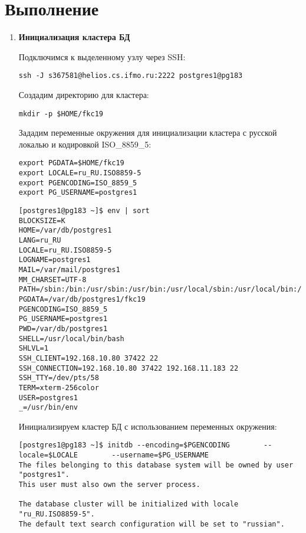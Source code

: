 \section{Выполнение}

\begin{enumerate}
\item \textbf{Инициализация кластера БД}

Подключимся к выделенному узлу через SSH:

\begin{verbatim}
ssh -J s367581@helios.cs.ifmo.ru:2222 postgres1@pg183
\end{verbatim}

Создадим директорию для кластера:

\begin{verbatim}
mkdir -p $HOME/fkc19
\end{verbatim}

Зададим переменные окружения для инициализации кластера с русской локалью и кодировкой ISO\_8859\_5:

\begin{verbatim}
export PGDATA=$HOME/fkc19
export LOCALE=ru_RU.ISO8859-5
export PGENCODING=ISO_8859_5
export PG_USERNAME=postgres1
\end{verbatim}

\begin{verbatim}
[postgres1@pg183 ~]$ env | sort
BLOCKSIZE=K
HOME=/var/db/postgres1
LANG=ru_RU
LOCALE=ru_RU.ISO8859-5
LOGNAME=postgres1
MAIL=/var/mail/postgres1
MM_CHARSET=UTF-8
PATH=/sbin:/bin:/usr/sbin:/usr/bin:/usr/local/sbin:/usr/local/bin:/var/db/postgres1/bin
PGDATA=/var/db/postgres1/fkc19
PGENCODING=ISO_8859_5
PG_USERNAME=postgres1
PWD=/var/db/postgres1
SHELL=/usr/local/bin/bash
SHLVL=1
SSH_CLIENT=192.168.10.80 37422 22
SSH_CONNECTION=192.168.10.80 37422 192.168.11.183 22
SSH_TTY=/dev/pts/58
TERM=xterm-256color
USER=postgres1
_=/usr/bin/env
\end{verbatim}


Инициализируем кластер БД с использованием переменных окружения:

\begin{verbatim}
[postgres1@pg183 ~]$ initdb --encoding=$PGENCODING        --locale=$LOCALE        --username=$PG_USERNAME
The files belonging to this database system will be owned by user "postgres1".
This user must also own the server process.

The database cluster will be initialized with locale "ru_RU.ISO8859-5".
The default text search configuration will be set to "russian".


\end{verbatim}
\end{enumerate}
